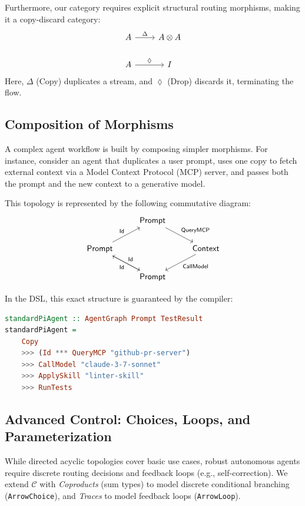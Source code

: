 \documentclass[journal]{IEEEtran}
\begin{document}
Furthermore, our category requires explicit structural routing morphisms, making it a copy-discard category:
\begin{equation}
\begin{tikzcd}
A \arrow[r, "\Delta"] & A \otimes A \\
A \arrow[r, "\lozenge"] & I
\end{tikzcd}
\end{equation}
Here, \(\Delta\) (Copy) duplicates a stream, and \(\lozenge\) (Drop) discards it, terminating the flow.

\subsection{Composition of Morphisms}
A complex agent workflow is built by composing simpler morphisms. For instance, consider an agent that duplicates a user prompt, uses one copy to fetch external context via a Model Context Protocol (MCP) server, and passes both the prompt and the new context to a generative model.

This topology is represented by the following commutative diagram:
\begin{equation}
\begin{tikzcd}
& \textsf{Prompt} \arrow[dr, "\textsf{QueryMCP}"] & \\
\textsf{Prompt} \arrow[ur, "\textsf{Id}"] \arrow[dr, "\textsf{Id}"'] & & \textsf{Context} \arrow[dl, "\textsf{CallModel}"] \\
& \textsf{Prompt} \arrow[ul, "\textsf{Id}"'] & 
\end{tikzcd}
\end{equation}

In the DSL, this exact structure is guaranteed by the compiler:
\begin{lstlisting}[language=Haskell, basicstyle=\ttfamily\footnotesize]
standardPiAgent :: AgentGraph Prompt TestResult
standardPiAgent = 
    Copy 
    >>> (Id *** QueryMCP "github-pr-server")
    >>> CallModel "claude-3-7-sonnet"
    >>> ApplySkill "linter-skill"
    >>> RunTests
\end{lstlisting}

\subsection{Advanced Control: Choices, Loops, and Parameterization}
While directed acyclic topologies cover basic use cases, robust autonomous agents require discrete routing decisions and feedback loops (e.g., self-correction). We extend $\mathcal{C}$ with \textit{Coproducts} (sum types) to model discrete conditional branching (\texttt{ArrowChoice}), and \textit{Traces} to model feedback loops (\texttt{ArrowLoop}). 
\end{document}
